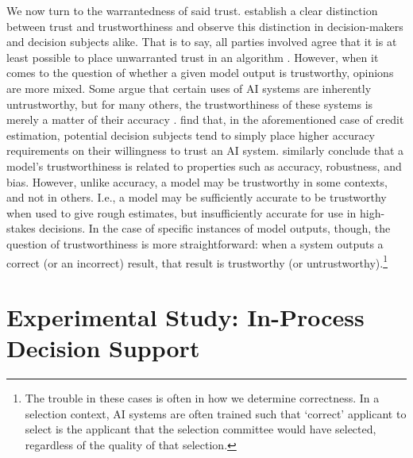 We now turn to the warrantedness of said trust. \textcite{Vereschak_Alizadeh_Bailly_Caramiaux_2024} establish a clear distinction between trust and trustworthiness and observe this distinction in decision-makers and decision subjects alike. That is to say, all parties involved agree that it is at least possible to place unwarranted trust in an algorithm \cite{Vereschak_Alizadeh_Bailly_Caramiaux_2024}. However, when it comes to the question of whether a given model output is trustworthy, opinions are more mixed. Some argue that certain uses of AI systems are inherently untrustworthy, but for many others, the trustworthiness of these systems is merely a matter of their accuracy \cite{Rebitschek_Gigerenzer_Wagner_2021}. \textcite{Rebitschek_Gigerenzer_Wagner_2021} find that, in the aforementioned case of credit estimation, potential decision subjects tend to simply place higher accuracy requirements on their willingness to trust an AI system. \textcite{jacovi_formalizing_2021} similarly conclude that a model's trustworthiness is related to properties such as accuracy, robustness, and bias. However, unlike accuracy, a model may be trustworthy in some contexts, and not in others. I.e., a model may be sufficiently accurate to be trustworthy when used to give rough estimates, but insufficiently accurate for use in high-stakes decisions. In the case of specific instances of model outputs, though, the question of trustworthiness is more straightforward: when a system outputs a correct (or an incorrect) result, that result is trustworthy (or untrustworthy).\footnote{The trouble in these cases is often in how we determine correctness. In a selection context, AI systems are often trained such that `correct' applicant to select is the applicant that the selection committee would have selected, regardless of the quality of that selection.}


\section[Experimental Study]{Experimental Study: In-Process Decision Support}\label{sec:online}
